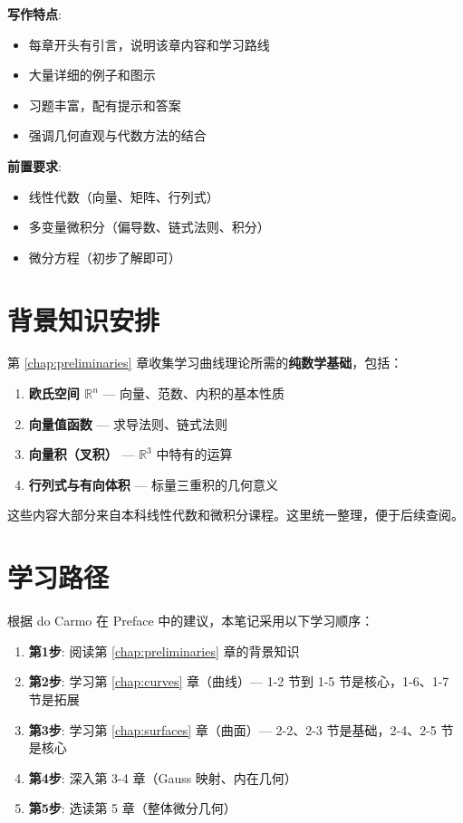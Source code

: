 \textbf{写作特点}:
\begin{itemize}
\item 每章开头有引言，说明该章内容和学习路线
\item 大量详细的例子和图示
\item 习题丰富，配有提示和答案
\item 强调几何直观与代数方法的结合
\end{itemize}

\textbf{前置要求}:
\begin{itemize}
\item 线性代数（向量、矩阵、行列式）
\item 多变量微积分（偏导数、链式法则、积分）
\item 微分方程（初步了解即可）
\end{itemize}

\section{背景知识安排}

第 \ref{chap:preliminaries} 章收集学习曲线理论所需的\textbf{纯数学基础}，包括：

\begin{enumerate}
\item \textbf{欧氏空间 $\mathbb{R}^n$} — 向量、范数、内积的基本性质
\item \textbf{向量值函数} — 求导法则、链式法则
\item \textbf{向量积（叉积）} — $\mathbb{R}^3$ 中特有的运算
\item \textbf{行列式与有向体积} — 标量三重积的几何意义
\end{enumerate}

这些内容大部分来自本科线性代数和微积分课程。这里统一整理，便于后续查阅。

\section{学习路径}

根据 do Carmo 在 Preface 中的建议，本笔记采用以下学习顺序：

\begin{enumerate}
\item \textbf{第1步}: 阅读第 \ref{chap:preliminaries} 章的背景知识
\item \textbf{第2步}: 学习第 \ref{chap:curves} 章（曲线）— 1-2 节到 1-5 节是核心，1-6、1-7 节是拓展
\item \textbf{第3步}: 学习第 \ref{chap:surfaces} 章（曲面）— 2-2、2-3 节是基础，2-4、2-5 节是核心
\item \textbf{第4步}: 深入第 3-4 章（Gauss 映射、内在几何）
\item \textbf{第5步}: 选读第 5 章（整体微分几何）
\end{enumerate}

